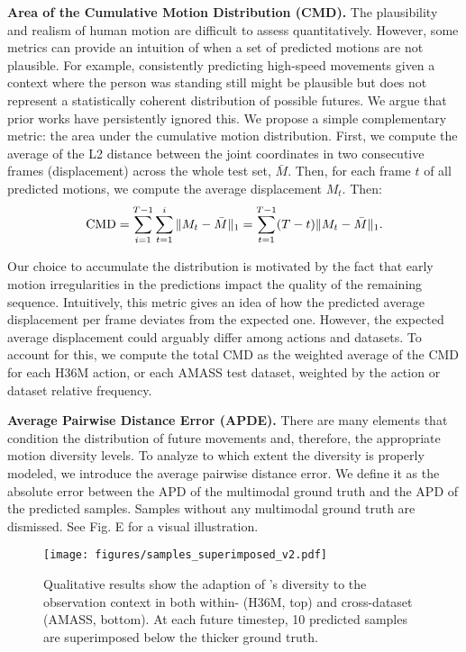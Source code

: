 \documentclass[10pt,twocolumn,letterpaper]{article}
\begin{document}
\textbf{Area of the Cumulative Motion Distribution (CMD).} The plausibility and realism of human motion are difficult to assess quantitatively. However, some metrics can provide an intuition of when a set of predicted motions are not plausible. 
For example, consistently predicting high-speed movements given a context where the person was standing still might be plausible but does not represent a statistically coherent distribution of possible futures. We argue that prior works have persistently ignored this. We propose a simple complementary metric: the area under the cumulative motion distribution. First, we compute the average of the L2 distance between the joint coordinates in two consecutive frames (displacement) across the whole test set, $\bar{M}$. Then, for each frame $t$ of all predicted motions, we compute the average displacement $M_{t}$. Then:
\vspace{-0.25cm}
\small\begin{equation}
    \text{CMD} = \sum_{i=1}^{T-1} \sum^i_{t=1} \| M_t - \bar{M}  \|_{1}= \sum_{t=1}^{T-1}(T-t) \| M_t - \bar{M}  \|_{1}.\vspace{-0.15cm}
\end{equation}\normalsize

Our choice to accumulate the distribution is motivated by the fact that early motion irregularities in the predictions impact the quality of the remaining sequence. Intuitively, this metric gives an idea of how the predicted average displacement per frame deviates from the expected one. However, the expected average displacement could arguably differ among actions and datasets. To account for this, we compute the total CMD as the weighted average of the CMD for each H36M action, or each AMASS test dataset, weighted by the action or dataset relative frequency.

\textbf{Average Pairwise Distance Error (APDE).} There are many elements that condition the distribution of future movements and, therefore, the appropriate motion diversity levels. To analyze to which extent the diversity is properly modeled, we introduce the average pairwise distance error. We define it as the absolute error between the APD of the multimodal ground truth and the APD of the predicted samples. Samples without any multimodal ground truth are dismissed. See \supp{} Fig. E for a visual illustration.
 

\begin{figure*}[t!]
    \centering
    \texttt{[image: figures/samples\_superimposed\_v2.pdf]}
\vspace{-0.5cm}
    \caption{Qualitative results show the adaption of \modelname{}'s diversity to the observation context in both within- (H36M, top) and cross-dataset (AMASS, bottom). At each future timestep, 10 predicted samples are superimposed below the thicker ground truth.}\label{fig:qualitative_examples}\vspace{-0.4cm}
\end{figure*}
\end{document}
